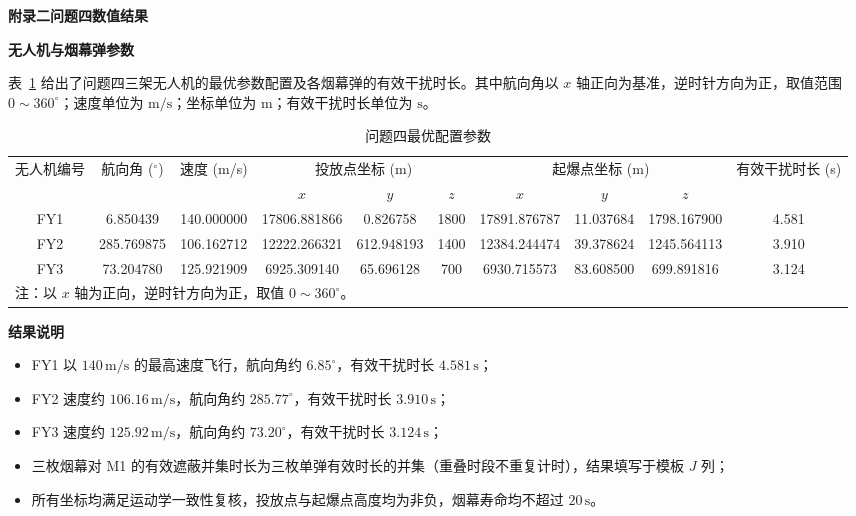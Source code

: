 \documentclass[12pt,a4paper]{article}
\begin{document}
	
	\textbf{附录二问题四数值结果}
	
	\textbf{无人机与烟幕弹参数}
	
	表~\ref{tab:result2} 给出了问题四三架无人机的最优参数配置及各烟幕弹的有效干扰时长。其中航向角以 $x$ 轴正向为基准，逆时针方向为正，取值范围 $0\sim360^\circ$；速度单位为 $\text{m/s}$；坐标单位为 $\text{m}$；有效干扰时长单位为 $\text{s}$。
	
	\begin{table}[H]
		\centering
		\caption{问题四最优配置参数}
		\label{tab:result2}
		\begin{tabular}{c|c|c|c|c|c|c|c|c|c}
			\hline
			\multirow{2}{*}{无人机编号} & \multirow{2}{*}{航向角 ($^\circ$)} & \multirow{2}{*}{速度 (m/s)} & \multicolumn{3}{c|}{投放点坐标 (m)} & \multicolumn{3}{c|}{起爆点坐标 (m)} & \multirow{2}{*}{有效干扰时长 (s)} \\
			\cline{4-9}
			& & & $x$ & $y$ & $z$ & $x$ & $y$ & $z$ & \\
			\hline
			FY1 & 6.850439 & 140.000000 & 17806.881866 & 0.826758 & 1800 & 17891.876787 & 11.037684 & 1798.167900 & 4.581 \\
			FY2 & 285.769875 & 106.162712 & 12222.266321 & 612.948193 & 1400 & 12384.244474 & 39.378624 & 1245.564113 & 3.910 \\
			FY3 & 73.204780 & 125.921909 & 6925.309140 & 65.696128 & 700 & 6930.715573 & 83.608500 & 699.891816 & 3.124 \\
			\hline
			\multicolumn{10}{l}{注：以 $x$ 轴为正向，逆时针方向为正，取值 $0\sim360^\circ$。} \\
		\end{tabular}
	\end{table}
	
	\textbf{结果说明}
	
	\begin{itemize}
		\item FY1 以 $140\,\text{m/s}$ 的最高速度飞行，航向角约 $6.85^\circ$，有效干扰时长 $4.581\,\text{s}$；
		\item FY2 速度约 $106.16\,\text{m/s}$，航向角约 $285.77^\circ$，有效干扰时长 $3.910\,\text{s}$；
		\item FY3 速度约 $125.92\,\text{m/s}$，航向角约 $73.20^\circ$，有效干扰时长 $3.124\,\text{s}$；
		\item 三枚烟幕对 M1 的有效遮蔽并集时长为三枚单弹有效时长的并集（重叠时段不重复计时），结果填写于模板 $J$ 列；
		\item 所有坐标均满足运动学一致性复核，投放点与起爆点高度均为非负，烟幕寿命均不超过 $20\,\text{s}$。
	\end{itemize}
	
\end{document}
